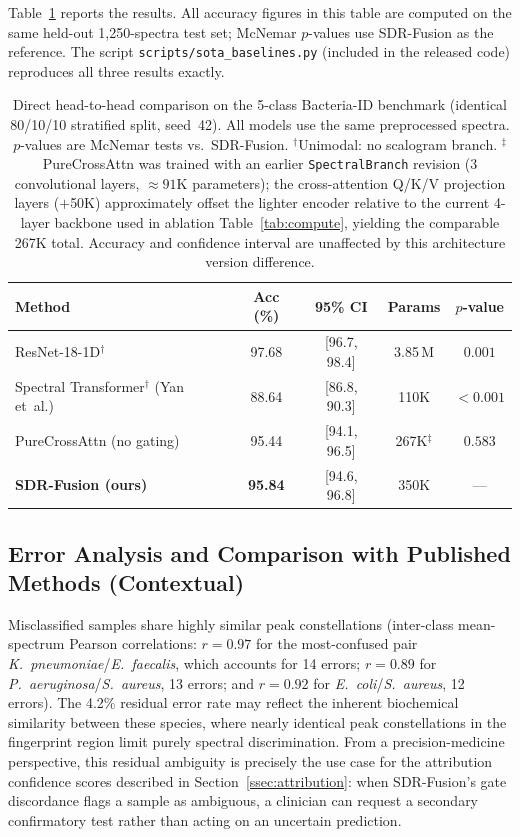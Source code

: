 \documentclass[preprint,12pt]{elsarticle}
\begin{document}
Table~\ref{tab:sota} reports the results. All accuracy figures in this
table are computed on the same held-out 1,250-spectra test set; McNemar
$p$-values use SDR-Fusion as the reference. The script
\texttt{scripts/sota\_baselines.py} (included in the released code)
reproduces all three results exactly.

\begin{table}[!t]
\centering
\caption{Direct head-to-head comparison on the 5-class Bacteria-ID
benchmark (identical 80/10/10 stratified split, seed~42). All models
use the same preprocessed spectra. $p$-values are McNemar tests
vs.\ SDR-Fusion. $^\dagger$Unimodal: no scalogram branch.
$^\ddagger$PureCrossAttn was trained with an earlier
\texttt{SpectralBranch} revision (3 convolutional layers,
${\approx}91$K parameters); the cross-attention Q/K/V projection
layers ($+$50K) approximately offset the lighter encoder relative
to the current 4-layer backbone used in ablation Table~\ref{tab:compute},
yielding the comparable 267K total. Accuracy and confidence interval
are unaffected by this architecture version difference.}
\label{tab:sota}
\begin{tabular}{lcccc}
  \toprule
  Method & Acc (\%) & 95\% CI & Params & $p$-value \\
  \midrule
  ResNet-18-1D$^\dagger$~\cite{he2016deep} & 97.68 & [96.7, 98.4] & 3.85\,M & $0.001$ \\
  Spectral Transformer$^\dagger$ (Yan et~al.)  & 88.64 & [86.8, 90.3] & 110K & $<0.001$ \\
  PureCrossAttn (no gating) & 95.44 & [94.1, 96.5] & 267K$^\ddagger$ & $0.583$ \\
  \midrule
  \textbf{SDR-Fusion (ours)} & \textbf{95.84} & [94.6, 96.8] & 350K & --- \\
  \bottomrule
\end{tabular}
\end{table}

\subsection{Error Analysis and Comparison with Published Methods (Contextual)}
\label{ssec:error_and_comparison}

Misclassified samples share highly similar peak constellations
(inter-class mean-spectrum Pearson correlations: $r{=}0.97$ for the
most-confused pair \textit{K.~pneumoniae}/\textit{E.~faecalis}, which
accounts for 14 errors; $r{=}0.89$ for
\textit{P.~aeruginosa}/\textit{S.~aureus}, 13 errors; and $r{=}0.92$
for \textit{E.~coli}/\textit{S.~aureus}, 12 errors). The 4.2\% residual error
rate may reflect the inherent biochemical similarity between these
species, where nearly identical peak constellations in the fingerprint
region limit purely spectral discrimination. From a
precision-medicine perspective, this residual ambiguity is precisely
the use case for the attribution confidence scores described in
Section~\ref{ssec:attribution}: when SDR-Fusion's gate discordance flags
a sample as ambiguous, a clinician can request a secondary confirmatory
test rather than acting on an uncertain prediction.
\end{document}
